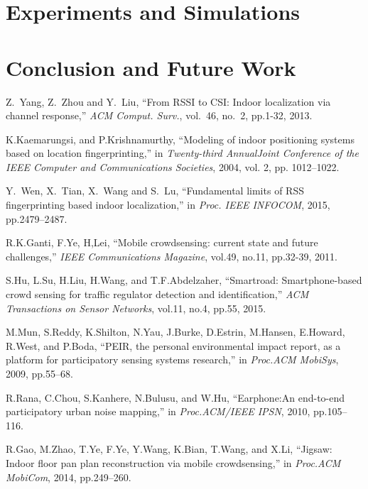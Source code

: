 \documentclass[10pt,conference,compsocconf,letterpaper]{IEEEtran}
\begin{document}
\section{Experiments and Simulations}



\section{Conclusion and Future Work}\label{concandfuture}





%

\begin{thebibliography}{99}

Z.~Yang, Z.~Zhou and Y.~Liu, ``From RSSI to CSI: Indoor localization via channel response,'' \emph{ACM Comput. Surv.}, vol.~46, no.~2, pp.1-32, 2013.

K.Kaemarungsi, and P.Krishnamurthy, ``Modeling of indoor positioning systems based on location fingerprinting,'' in \emph{Twenty-third AnnualJoint Conference of the IEEE Computer and Communications Societies}, 2004, vol. 2, pp. 1012--1022.

Y.~Wen, X.~Tian, X.~Wang and S.~Lu, ``Fundamental limits of RSS fingerprinting based indoor localization,'' in \emph{Proc. IEEE INFOCOM}, 2015, pp.2479--2487.

R.K.Ganti, F.Ye, H,Lei, ``Mobile crowdsensing: current state and future challenges,'' \emph{IEEE Communications Magazine}, vol.49, no.11, pp.32-39, 2011.

S.Hu, L.Su, H.Liu, H.Wang, and T.F.Abdelzaher, ``Smartroad: Smartphone-based crowd sensing for traffic regulator detection and identification,'' \emph{ACM Transactions on Sensor Networks}, vol.11, no.4, pp.55, 2015.

M.Mun, S.Reddy, K.Shilton, N.Yau, J.Burke, D.Estrin, M.Hansen, E.Howard, R.West, and P.Boda, ``PEIR, the personal environmental impact report, as a platform for participatory sensing systems research,'' in \emph{Proc.ACM MobiSys}, 2009, pp.55--68.

R.Rana, C.Chou, S.Kanhere, N.Bulusu, and W.Hu, ``Earphone:An end-to-end participatory urban noise mapping,'' in \emph{Proc.ACM/IEEE IPSN}, 2010, pp.105--116.

R.Gao, M.Zhao, T.Ye, F.Ye, Y.Wang, K.Bian, T.Wang, and X.Li, ``Jigsaw: Indoor floor pan plan reconstruction via mobile crowdsensing,'' in \emph{Proc.ACM MobiCom}, 2014, pp.249--260.


\end{thebibliography}
\end{document}
